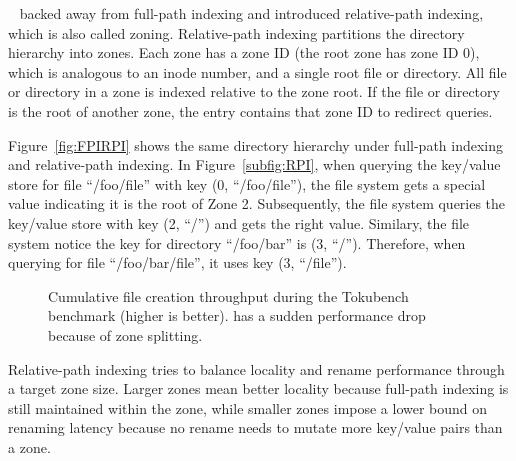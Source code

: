 \betrfsTwo~\citep{betrfs2,betrfs2tos} backed away from full-path indexing and
introduced relative-path indexing, which is also called zoning.
Relative-path indexing partitions the directory hierarchy into zones.
Each zone has a zone ID (the root zone has zone ID 0), which is analogous to an
inode number, and a single root file or directory.
All file or directory in a zone is indexed relative to the zone root.
If the file or directory is the root of another zone, the entry contains that
zone ID to redirect queries.

Figure~\ref{fig:FPIRPI} shows the same directory hierarchy under full-path
indexing and relative-path indexing.
In Figure~\ref{subfig:RPI}, when querying the key/value store for file
``/foo/file'' with key (0, ``/foo/file''), the file system gets a special value
indicating it is the root of Zone 2.
Subsequently, the file system queries the key/value store with key (2, ``/'')
and gets the right value.
Similary, the file system notice the key for directory ``/foo/bar'' is
(3, ``/'').
Therefore, when querying for file ``/foo/bar/file'', it uses key (3, ``/file'').

\begin{figure}[t]
    \centering
    \caption[Zone maintainance cost in TokuBench]{Cumulative file creation
        throughput during the Tokubench benchmark (higher is better).
        \betrfsThree has a sudden performance drop because of zone splitting.}
    \label{fig:tokuzone}
\end{figure}

Relative-path indexing tries to balance locality and rename performance through
a target zone size.
Larger zones mean better locality because full-path indexing is still maintained
within the zone, while smaller zones impose a lower bound on renaming latency
because no rename needs to mutate more key/value pairs than a zone.

